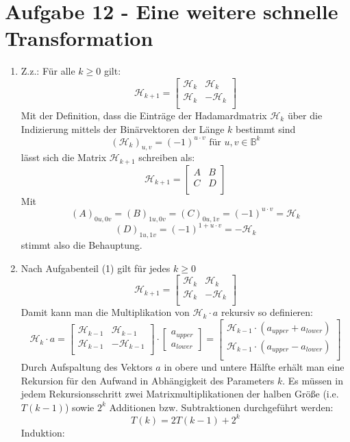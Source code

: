 \section*{Aufgabe 12 - Eine weitere schnelle Transformation}

\renewcommand{\H}{\mathcal{H}}
\begin{enumerate}[1.]
	\item Z.z.: Für alle $k \geq 0$ gilt:
	\[ \H_{k+1} = \begin{bmatrix}
		\H_k & \H_k \\
		\H_k & -\H_k \\
	\end{bmatrix} \]
	Mit der Definition, dass die Einträge der Hadamardmatrix $\H_k$ über die Indizierung
	mittels der Binärvektoren der Länge $k$ bestimmt sind
	\[ \left( \H_k \right)_{u,v} = (-1)^{u \cdot v} \text{ für } u,v \in \mathds{B}^k \]
	lässt sich die Matrix $\H_{k+1}$ schreiben als:
	\[ \H_{k+1} = \begin{bmatrix}
		A & B \\
		C & D \\
	\end{bmatrix} \]
	Mit
	\[ \left( A \right)_{0u,0v} = \left( B\right)_{1u, 0v} = \left( C \right)_{0u, 1v} = (-1)^{u \cdot v} = \H_k \]
	\[ \left( D \right)_{1u, 1v} = (-1)^{1 + u \cdot v} = - \H_k \]
	stimmt also die Behauptung.

	\item Nach Aufgabenteil (1) gilt für jedes $k \geq 0$
	\[ \H_{k+1} = \begin{bmatrix}
		\H_k & \H_k \\
		\H_k & -\H_k \\
	\end{bmatrix} \]
	Damit kann man die Multiplikation von $\H_k \cdot a$ rekursiv so definieren:
	\[ \H_k \cdot a = 
	\begin{bmatrix}
		\H_{k-1} & \H_{k-1} \\
		\H_{k-1} & -\H_{k-1} \\
	\end{bmatrix} \cdot
	\begin{bmatrix}
		a_{upper} \\
		a_{lower}
	\end{bmatrix} = 
	\begin{bmatrix}
		\H_{k-1} \cdot (a_{upper} + a_{lower}) \\
		\H_{k-1} \cdot (a_{upper} - a_{lower}) \\
	\end{bmatrix} \]
	Durch Aufspaltung des Vektors $a$ in obere und untere Hälfte erhält man
	eine Rekursion für den Aufwand in Abhängigkeit des Parameters $k$. Es
	müssen in jedem Rekursions\-schritt zwei Matrixmultiplikationen der
	halben Größe (i.e. $T(k-1)$) sowie $2^k$ Additionen bzw. Subtraktionen
	durchgeführt werden:
	\[ T(k) = 2 T(k-1) + 2^k \]
	Induktion:


\end{enumerate}
